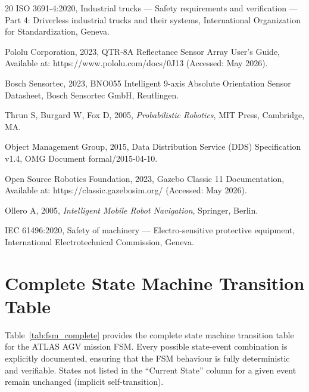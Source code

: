 \documentclass[12pt,a4paper,oneside]{report}
\begin{document}
\begin{thebibliography}{20}
 ISO 3691-4:2020, Industrial trucks --- Safety requirements and verification --- Part 4: Driverless industrial trucks and their systems, International Organization for Standardization, Geneva.

 Pololu Corporation, 2023, QTR-8A Reflectance Sensor Array User's Guide, Available at: https://www.pololu.com/docs/0J13 (Accessed: May 2026).

 Bosch Sensortec, 2023, BNO055 Intelligent 9-axis Absolute Orientation Sensor Datasheet, Bosch Sensortec GmbH, Reutlingen.

 Thrun S, Burgard W, Fox D, 2005, \textit{Probabilistic Robotics}, MIT Press, Cambridge, MA.

 Object Management Group, 2015, Data Distribution Service (DDS) Specification v1.4, OMG Document formal/2015-04-10.

 Open Source Robotics Foundation, 2023, Gazebo Classic 11 Documentation, Available at: https://classic.gazebosim.org/ (Accessed: May 2026).

 Ollero A, 2005, \textit{Intelligent Mobile Robot Navigation}, Springer, Berlin.

 IEC 61496:2020, Safety of machinery --- Electro-sensitive protective equipment, International Electrotechnical Commission, Geneva.

\end{thebibliography}


\appendix
\chapter{Complete State Machine Transition Table}

Table~\ref{tab:fsm_complete} provides the complete state machine transition table for the ATLAS AGV mission FSM. Every possible state-event combination is explicitly documented, ensuring that the FSM behaviour is fully deterministic and verifiable. States not listed in the ``Current State'' column for a given event remain unchanged (implicit self-transition).
\end{document}
